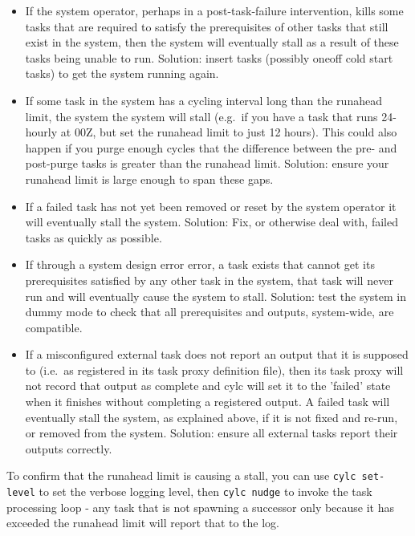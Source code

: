\documentclass[11pt,a4paper]{article}
\begin{document}
\begin{itemize}
    \item If the system operator, perhaps in a post-task-failure
    intervention, kills some tasks that are required to satisfy the
    prerequisites of other tasks that still exist in the system, then 
    the system will eventually stall as a result of these tasks being
    unable to run. Solution: insert tasks (possibly oneoff cold start
    tasks) to get the system running again.

    \item If some task in the system has a cycling interval long than
        the runahead limit, the system the system will stall (e.g.\ if
    you have a task that runs 24-hourly at 00Z, but set the runahead
    limit to just 12 hours). This could also happen if you purge enough
    cycles that the difference between the pre- and post-purge tasks
    is greater than the runahead limit. Solution: ensure your runahead
    limit is large enough to span these gaps.

    \item If a failed task has not yet been removed or reset by the
    system operator it will eventually stall the system. Solution:
    Fix, or otherwise deal with, failed tasks as quickly as possible.

    \item If through a system design error error, a task exists that
        cannot get its prerequisites satisfied by any other task in the
        system, that task will never run and will eventually cause the
        system to stall.  Solution: test the system in dummy mode to 
        check that all prerequisites and outputs, system-wide, are 
        compatible.

    \item If a misconfigured external task does not report an output
        that it is supposed to (i.e.\ as registered in its task proxy
        definition file), then its task proxy will not record that 
        output as complete and cylc will set it to the 'failed' state
        when it finishes without completing a registered output. A
        failed task will eventually stall the system, as explained above, 
        if it is not fixed and re-run, or removed from the system.
        Solution: ensure all external tasks report their outputs
        correctly.

\end{itemize}

To confirm that the runahead limit is causing a stall, you can use 
\lstinline=cylc set-level= to set the verbose logging level, then
\lstinline=cylc nudge= to invoke the task processing loop - any task
that is not spawning a successor only because it has exceeded the runahead
limit will report that to the log.
\end{document}
